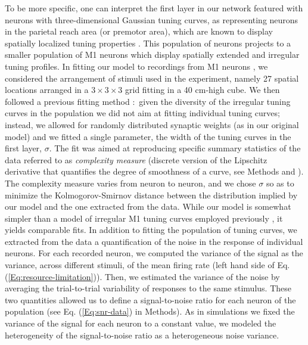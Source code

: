 \documentclass[a4paper]{article}%
\begin{document}
To be more specific, one can interpret the first layer in our network featured
with neurons with three-dimensional Gaussian tuning curves, as representing
neurons in the parietal reach area (or premotor area), which are known to
display spatially localized tuning properties
\cite[]{Andersen1985EncodingNeurons}. This population of neurons projects to a
smaller population of M1 neurons which display spatially extended and
irregular tuning profiles. In fitting our model to recordings from M1 neurons
\cite[]{Lalazar2016TuningConnectivity}, we considered the arrangement of stimuli
used in the experiment, namely 27 spatial locations arranged in a
$3\times3\times3$ grid fitting in a 40 cm-high cube. We then followed a
previous fitting method
\cite[]{Lalazar2016TuningConnectivity,Arakaki2019InferringCurvesb}:\ given the
diversity of the irregular tuning curves in the population we did not aim at
fitting individual tuning curves; instead, we allowed for randomly distributed
synaptic weights (as in our original model) and we fitted a single parameter,
the width of the tuning curves in the first layer, $\sigma$. The fit was aimed
at reproducing specific summary statistics of the data referred to as
\textit{complexity measure} (discrete version of the Lipschitz derivative that
quantifies the degree of smoothness of a curve, see Methods and 
\cite{Lalazar2016TuningConnectivity}). The complexity measure varies from
neuron to neuron, and we chose $\sigma$ so as to minimize the
Kolmogorov-Smirnov distance between the distribution implied by our model and
the one extracted from the data. While our model is somewhat simpler than a
model of irregular M1 tuning curves employed previously
\cite[]{Lalazar2016TuningConnectivity}, it yields comparable fits. In addition
to fitting the population of tuning curves, we extracted from the data a
quantification of the noise in the response of individual neurons. For each
recorded neuron, we computed the variance of the signal as the variance,
across different stimuli, of the mean firing rate (left hand side of Eq.
(\ref{Eq:resource-limitation})). Then, we estimated the variance of the noise
by averaging the trial-to-trial variability of responses to the same stimulus.
These two quantities allowed us to define a signal-to-noise ratio for each
neuron of the population (see Eq. (\ref{Eq:snr-data}) in Methods). As in
simulations we fixed the variance of the signal for each neuron to a constant
value, we modeled the heterogeneity of the signal-to-noise ratio as a
heterogeneous noise variance.
\end{document}
